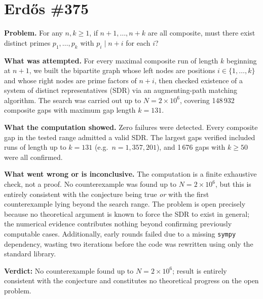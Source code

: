 \section{Erdős \#375}

\textbf{Problem.} For any $n,k\geq 1$, if $n+1,\ldots,n+k$ are all composite, must there exist distinct primes $p_1,\ldots,p_k$ with $p_i\mid n+i$ for each $i$?

\textbf{What was attempted.} For every maximal composite run of length $k$ beginning at $n+1$, we built the bipartite graph whose left nodes are positions $i\in\{1,\ldots,k\}$ and whose right nodes are prime factors of $n+i$, then checked existence of a system of distinct representatives (SDR) via an augmenting-path matching algorithm. The search was carried out up to $N=2\times10^6$, covering 148\,932 composite gaps with maximum gap length $k=131$.

\textbf{What the computation showed.} Zero failures were detected. Every composite gap in the tested range admitted a valid SDR. The largest gaps verified included runs of length up to $k=131$ (e.g.\ $n=1{,}357{,}201$), and 1\,676 gaps with $k\geq 50$ were all confirmed.

\textbf{What went wrong or is inconclusive.} The computation is a finite exhaustive check, not a proof. No counterexample was found up to $N=2\times10^6$, but this is entirely consistent with the conjecture being true \emph{or} with the first counterexample lying beyond the search range. The problem is open precisely because no theoretical argument is known to force the SDR to exist in general; the numerical evidence contributes nothing beyond confirming previously computable cases. Additionally, early rounds failed due to a missing \texttt{sympy} dependency, wasting two iterations before the code was rewritten using only the standard library.

\textbf{Verdict:} No counterexample found up to $N=2\times10^6$; result is entirely consistent with the conjecture and constitutes no theoretical progress on the open problem.